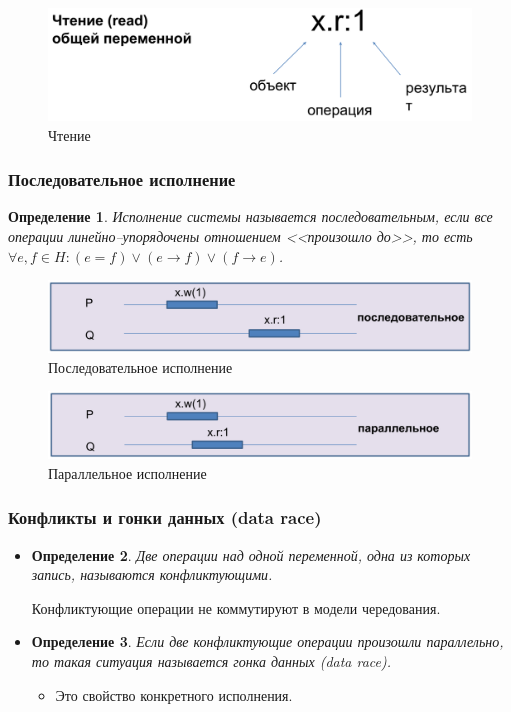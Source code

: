 \documentclass[10pt,a4paper,oneside,titlepage]{article}
\theoremstyle{plain}
\theoremstyle{defenition}
\newtheorem*{defenition}{Определение}
\begin{document}
\begin{figure}[h!]
	\centering
	\includegraphics[width=0.6\linewidth]{pictures/Read}
	\caption{Чтение}
	\label{fig:read}
\end{figure}


\subsubsection{Последовательное исполнение}
\begin{defenition}
	Исполнение системы называется последовательным, если все операции линейно--упорядочены отношением <<произошло до>>, то есть $\forall e, f\in H\colon (e=f)\vee(e\to f)\vee(f\to e)$.
\end{defenition}

\begin{figure}
	\centering
	\includegraphics[width=0.4\linewidth]{pictures/Model4}
	\caption{Последовательное исполнение}
	\label{fig:model4}
\end{figure}

\begin{figure}
	\centering
	\includegraphics[width=0.4\linewidth]{pictures/Model5}
	\caption{Параллельное исполнение}
	\label{fig:model5}
\end{figure}

\subsubsection{Конфликты и гонки данных (data race)}
\begin{itemize}
	\item \begin{defenition}
		Две операции над одной переменной, одна из которых запись, называются конфликтующими.
	\end{defenition}
    Конфликтующие операции не коммутируют в модели чередования.
	\item \begin{defenition}
		Если две конфликтующие операции произошли параллельно, то такая ситуация называется гонка данных (data race).
	\end{defenition} 
	\begin{itemize}
		\item Это свойство конкретного исполнения.
	\end{itemize}
\end{itemize}
\end{document}
